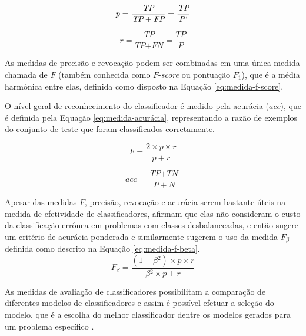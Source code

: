         \vspace{\parskip}
        \noindent\begin{minipage}{.5\textwidth}
            \begin{equation}
                \label{eq:medida-precisão}
        		p = 
        		\frac{\textit{TP}}{\textit{TP} + \textit{FP}}
        		= \frac{\textit{TP}}{P`}
            \end{equation}
        \end{minipage}
        \begin{minipage}{.5\textwidth}
            \begin{equation}
                \label{eq:medida-revocação}
        		r = 
        		\frac{\textit{TP}}{\textit{TP} + \textit{FN}}
        		= \frac{\textit{TP}}{P}
            \end{equation}
        \end{minipage}
        \vspace{\parskip}
        
        As medidas de precisão e revocação podem ser combinadas em uma única medida chamada de $F$ (também conhecida como $F$-\textit{score} ou pontuação ${F_1}$), que é a média harmônica entre elas, definida como disposto na Equação \ref{eq:medida-f-score}.

        O nível geral de reconhecimento do classificador é medido pela acurácia ($acc$), que é definida pela Equação \ref{eq:medida-acurácia}, representando a razão de exemplos do conjunto de teste que foram classificados corretamente.
        
        \vspace{\parskip}
        \noindent\begin{minipage}{.5\textwidth}
            \begin{equation}
                \label{eq:medida-f-score}
        		F = 
        		\frac{2 \times p \times r}{p + r}
            \end{equation}
        \end{minipage}
        \begin{minipage}{.5\textwidth}
            \begin{equation}
                \label{eq:medida-acurácia}
        		acc = 
        		\frac{\textit{TP} + \textit{TN}}{P + N}
            \end{equation}
        \end{minipage}
        \vspace{\parskip}
        
        Apesar das medidas $F$, precisão, revocação e acurácia serem bastante úteis na medida de efetividade de classificadores,  afirmam que elas não consideram o custo da classificação errônea em problemas com classes desbalanceadas, e então sugere um critério de acurácia ponderada e similarmente  sugerem o uso da medida $F_\beta{}$ definida como descrito na Equação \ref{eq:medida-f-beta}.        \begin{equation}
            \label{eq:medida-f-beta}
    		F_\beta{} = 
    		\frac{(1 + \beta{}^2) \times p \times r}{\beta{}^2 \times p + r}
        \end{equation}
        
        As medidas de avaliação de classificadores possibilitam a comparação de diferentes modelos de classificadores e assim é possível efetuar a seleção do modelo, que é a escolha do melhor classificador dentre os modelos gerados para um problema específico \cite[p.~364]{Han:2011:DMC:1972541}.